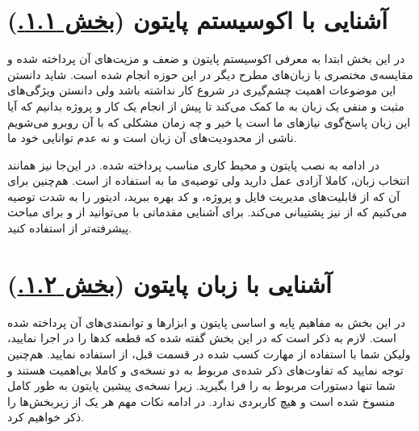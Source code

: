 \documentclass[11pt, a4paper]{article}
\begin{document}
\section{آشنایی با اکوسیستم پایتون  (\href{https://scipy-lectures.org/intro/intro.html}{بخش ۱.۱.})}
در این بخش ابتدا به معرفی اکوسیستم پایتون و ضعف و مزیت‌های آن پرداخته شده
و مقایسه‌ی مختصری با زبان‌های مطرح دیگر در این حوزه انجام شده است.
شاید دانستن این موضوعات اهمیت چشم‌گیری در شروع کار نداشته باشد
ولی دانستن ویژگی‌های مثبت و منفی یک زبان به ما کمک می‌کند
تا پیش از انجام یک کار و پروژه بدانیم که آیا این‌ زبان پاسخ‌گوی نیاز‌های ما است یا خیر
و چه زمان مشکلی که با آن روبرو می‌شویم ناشی از محدودیت‌های آن زبان است و نه عدم توانایی خود ما.

در ادامه به نصب پایتون و محیط کاری مناسب پرداخته شده.
در این‌جا نیز همانند انتخاب زبان،
کاملا آزادی عمل دارید ولی توصیه‌ی ما به استفاده از
\href{https://jupyter.org/}{}
است.
هم‌چنین برای آن که از قابلیت‌های مدیریت فایل و پروژه،
و
کد بهره ببرید،
ادیتور
\href{https://code.visualstudio.com/docs/languages/python}{}
را به شدت توصیه می‌کنیم که از
نیز پشتیبانی می‌کند.
برای آشنایی مقدماتی با
می‌توانید از
\href{https://www.dataquest.io/blog/jupyter-notebook-tutorial/}{}
و برای مباحث پیشرفته‌تر از
\href{https://www.dataquest.io/blog/advanced-jupyter-notebooks-tutorial/}{}
استفاده کنید.


\section{آشنایی با زبان پایتون (\href{https://scipy-lectures.org/intro/language/python_language.html}{بخش ۱.۲.})}
در این بخش به مفاهیم پایه و اساسی پایتون و ابزار‌ها و توانمندی‌های آن پرداخته شده است.
لازم به ذکر است که در این بخش گفته شده که قطعه کد‌ها را در
اجرا نمایید، ولیکن شما با استفاده از مهارت کسب شده در قسمت قبل،
از
استفاده نمایید.
هم‌چنین توجه نمایید که تفاوت‌های ذکر شده‌ی مربوط به دو نسخه‌ی
و
کاملا بی‌اهمیت هستند و شما تنها
دستورات مربوط به
را فرا بگیرید.
زیرا نسخه‌ی پیشین پایتون به طور کامل منسوخ شده است و هیچ کاربردی ندارد.
در ادامه نکات مهم هر یک از زیربخش‌ها را ذکر خواهیم کرد.
\end{document}
